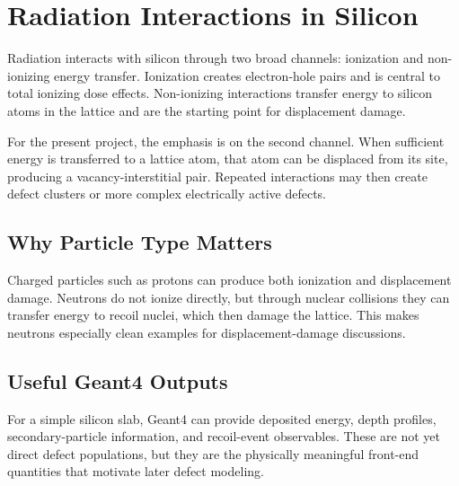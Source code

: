 \documentclass[../../project_master.tex]{subfiles}
\begin{document}
\section{Radiation Interactions in Silicon}
Radiation interacts with silicon through two broad channels: ionization and non-ionizing energy transfer. Ionization creates electron-hole pairs and is central to total ionizing dose effects. Non-ionizing interactions transfer energy to silicon atoms in the lattice and are the starting point for displacement damage.

For the present project, the emphasis is on the second channel. When sufficient energy is transferred to a lattice atom, that atom can be displaced from its site, producing a vacancy-interstitial pair. Repeated interactions may then create defect clusters or more complex electrically active defects.

\subsection{Why Particle Type Matters}
Charged particles such as protons can produce both ionization and displacement damage. Neutrons do not ionize directly, but through nuclear collisions they can transfer energy to recoil nuclei, which then damage the lattice. This makes neutrons especially clean examples for displacement-damage discussions.

\subsection{Useful Geant4 Outputs}
For a simple silicon slab, Geant4 can provide deposited energy, depth profiles, secondary-particle information, and recoil-event observables. These are not yet direct defect populations, but they are the physically meaningful front-end quantities that motivate later defect modeling.
\end{document}
